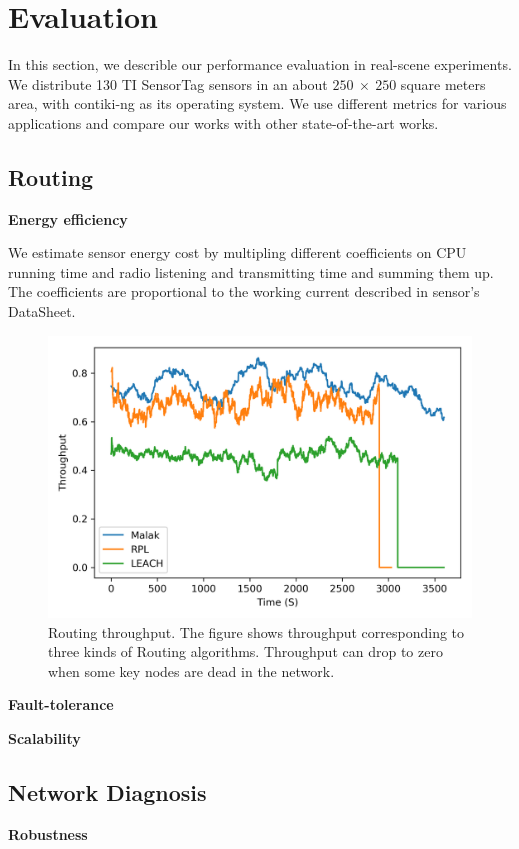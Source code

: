 \section{Evaluation}
\label{Eva}

In this section, we describle our performance evaluation in real-scene
experiments. We distribute 130 TI SensorTag sensors in an about $250~\times~250$
square meters area, with contiki-ng as its operating system. We use different
metrics for various applications and compare our works with other
state-of-the-art works.

\subsection{Routing}
\textbf{Energy efficiency}

We estimate sensor energy cost by multipling different coefficients on CPU
running time and radio listening and transmitting time and summing them up. The
coefficients are proportional to the working current described in sensor's
DataSheet.

\begin{figure}[htbp]
	\centering
	\includegraphics[width=.85\columnwidth]{Figure/throughput}
	\vspace{-0.1in}
	\caption{Routing throughput.
		\textnormal{The figure shows throughput
			corresponding to three kinds of Routing algorithms. Throughput can
			drop to zero when some key nodes are dead in the network.}}
	\label{throughput}
	\vspace{-0.2in}
\end{figure}

\textbf{Fault-tolerance}

\textbf{Scalability}

\subsection{Network Diagnosis}
\textbf{Robustness}

